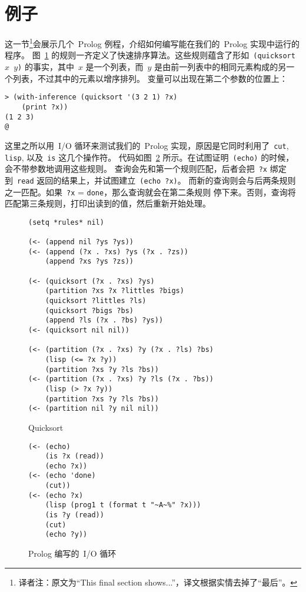 \section{例子}
\label{sec:prolog:examples}

这一节\footnote{译者注：原文为``This final section shows...''，译文根据实情去掉了``最后''。}会展示几个~Prolog 例程，介绍如何编写能在我们的~Prolog 实现中运行的程序。
图~\ref{fig:quicksort} 的规则一齐定义了快速排序算法。这些规则蕴含了形如~\texttt{(quicksort $x$ $y$)}
的事实，其中~$x$ 是一个列表，而~$y$ 是由前一列表中的相同元素构成的另一个列表，不过其中的元素以增序排列。
变量可以出现在第二个参数的位置上：
\begin{lstlisting}
> (with-inference (quicksort '(3 2 1) ?x)
    (print ?x))
(1 2 3)
@
\end{lstlisting}

这里之所以用~\textsc{I/O} 循环来测试我们的~Prolog 实现，原因是它同时利用了~\verb|cut|, \verb|lisp|, 以及~\verb|is| 这几个操作符。
代码如图~\ref{fig:io_loop_in_prolog} 所示。在试图证明~\verb|(echo)| 的时候，会不带参数地调用这些规则。
查询会先和第一个规则匹配，后者会把~\verb|?x| 绑定到~\verb|read| 返回的结果上，并试图建立~\verb|(echo ?x)|。
而新的查询则会与后两条规则之一匹配。如果~\verb|?x| = \verb|done|，那么查询就会在第二条规则
停下来。否则，查询将匹配第三条规则，打印出读到的值，然后重新开始处理。

\begin{figure}
\begin{lstlisting}
(setq *rules* nil)

(<- (append nil ?ys ?ys))
(<- (append (?x . ?xs) ?ys (?x . ?zs))
    (append ?xs ?ys ?zs))

(<- (quicksort (?x . ?xs) ?ys)
    (partition ?xs ?x ?littles ?bigs)
    (quicksort ?littles ?ls)
    (quicksort ?bigs ?bs)
    (append ?ls (?x . ?bs) ?ys))
(<- (quicksort nil nil))

(<- (partition (?x . ?xs) ?y (?x . ?ls) ?bs)
    (lisp (<= ?x ?y))
    (partition ?xs ?y ?ls ?bs))
(<- (partition (?x . ?xs) ?y ?ls (?x . ?bs))
    (lisp (> ?x ?y))
    (partition ?xs ?y ?ls ?bs))
(<- (partition nil ?y nil nil))
\end{lstlisting}
  \caption{Quicksort}
  \label{fig:quicksort}
\end{figure}

\begin{figure}
\begin{lstlisting}
(<- (echo)
    (is ?x (read))
    (echo ?x))
(<- (echo 'done)
    (cut))
(<- (echo ?x)
    (lisp (prog1 t (format t "~A~%" ?x)))
    (is ?y (read))
    (cut)
    (echo ?y))
\end{lstlisting}
  \caption{Prolog 编写的~I/O 循环}
  \label{fig:io_loop_in_prolog}
\end{figure}

